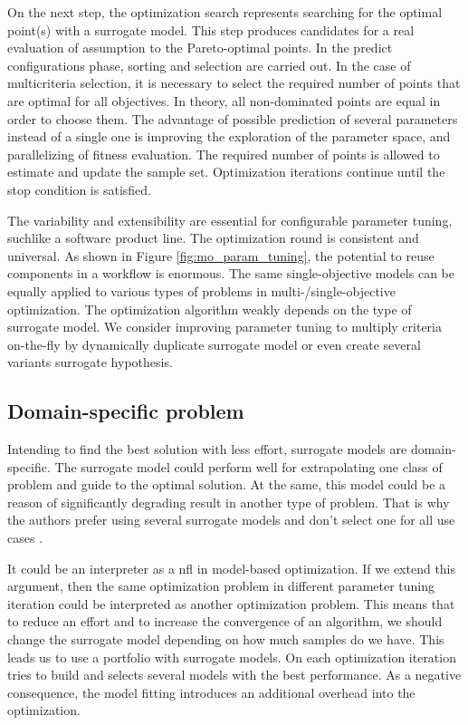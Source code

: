             On the next step, the optimization search represents searching for the optimal point(s) with a surrogate model. This step produces candidates for a real evaluation of assumption to the Pareto-optimal points. In the predict configurations phase, sorting and selection are carried out. In the case of multicriteria selection, it is necessary to select the required number of points that are optimal for all objectives. In theory, all non-dominated points are equal in order to choose them. The advantage of possible prediction of several parameters instead of a single one is improving the exploration of the parameter space, and parallelizing of fitness evaluation. The required number of points is allowed to estimate and update the sample set. Optimization iterations continue until the stop condition is satisfied.
    
            The variability and extensibility are essential for configurable parameter tuning, suchlike a software product line. The optimization round is consistent and universal. As shown in Figure \ref{fig:mo_param_tuning}, the potential to reuse components in a workflow is enormous. The same single-objective models can be equally applied to various types of problems in multi-/single-objective optimization. The optimization algorithm weakly depends on the type of surrogate model. We consider improving parameter tuning to multiply criteria on-the-fly by dynamically duplicate surrogate model or even create several variants surrogate hypothesis.

        \subsection{Domain-specific problem}
        Intending to find the best solution with less effort, surrogate models are domain-specific. The surrogate model could perform well for extrapolating one class of problem and guide to the optimal solution. At the same, this model could be a reason of significantly degrading result in another type of problem. That is why the authors prefer using several surrogate models and don't select one for all use cases \cite{SoftSurvey}.

        It could be an interpreter as a \Gls{nfl} in model-based optimization. If we extend this argument, then the same optimization problem in different parameter tuning iteration could be interpreted as another optimization problem. This means that to reduce an effort and to increase the convergence of an algorithm, we should change the surrogate model depending on how much samples do we have. 
        This leads us to use a portfolio with surrogate models. On each optimization iteration tries to build and selects several models with the best performance. As a negative consequence, the model fitting introduces an additional overhead into the optimization.


